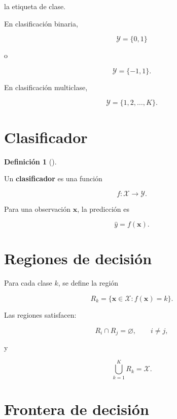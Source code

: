 \documentclass[
  spanish,
  10.5pt,
  letterpaper,
  DIV=11,
  numbers=noendperiod,
  oneside,
  open=any]{scrreprt}
\theoremstyle{definition}
\newtheorem{definition}{Definición}[chapter]
\theoremstyle{definition}
\theoremstyle{plain}
\theoremstyle{remark}
\begin{document}
la etiqueta de clase.

En clasificación binaria,

\[
\mathcal{Y}=\{0,1\}
\]

o

\[
\mathcal{Y}=\{-1,1\}.
\]

En clasificación multiclase,

\[
\mathcal{Y}
=
\{1,2,\ldots,K\}.
\]

\section*{Clasificador}\label{clasificador}


\begin{definition}[]\protect\hypertarget{def-clasificador}{}\label{def-clasificador}

Un \textbf{clasificador} es una función

\[
f:\mathcal{X}\to\mathcal{Y}.
\]

\end{definition}

Para una observación \(\mathbf{x}\), la predicción es

\[
\widehat{y}
=
f(\mathbf{x}).
\]

\section*{Regiones de decisión}\label{regiones-de-decisiuxf3n}


Para cada clase \(k\), se define la región

\[
R_k
=
\{
\mathbf{x}\in\mathcal{X}
:
f(\mathbf{x})=k
\}.
\]

Las regiones satisfacen:

\[
R_i\cap R_j=\varnothing,
\qquad
i\neq j,
\]

y

\[
\bigcup_{k=1}^{K}R_k
=
\mathcal{X}.
\]

\section*{Frontera de decisión}\label{frontera-de-decisiuxf3n}

\end{document}
